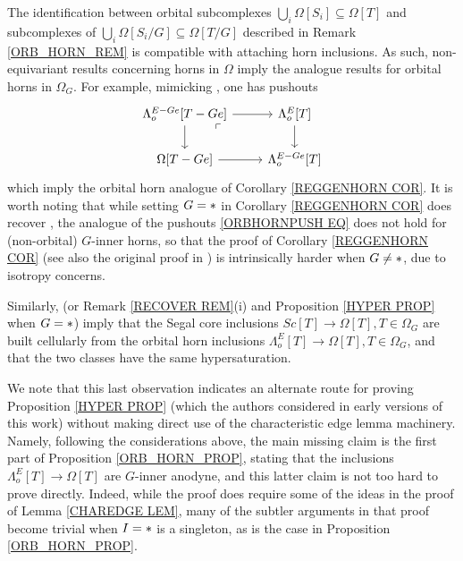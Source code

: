 \documentclass[a4paper,10pt
,draft
]{article}%
\begin{document}
\begin{remark}
	The identification between orbital subcomplexes 
	$\bigcup_i \Omega[S_i] \subseteq \Omega[T]$ and subcomplexes of 
	$\bigcup_i \Omega[S_i/G] \subseteq \Omega[T/G]$
	described in Remark \ref{ORB_HORN_REM}
	is compatible with attaching horn inclusions.
	As such, non-equivariant results concerning horns in $\Omega$
	imply the analogue results for orbital horns in $\Omega_G$. For example, mimicking \cite[Lemma 5.1]{MW09}, one has pushouts	
\begin{equation}\label{ORBHORNPUSH EQ}
\begin{tikzcd}
	\Lambda^{E - G e}_o[T - Ge] \arrow[r] \arrow[d]
	\arrow[dr, phantom, "\ulcorner", very near start] &
	\Lambda^{E}_o[T] \arrow[d]
\\
	\Omega[T - G e] \arrow[r]&
	\Lambda^{E - G e}_o[T]
\end{tikzcd}
\end{equation}	
which imply the orbital horn analogue of 
Corollary \ref{REGGENHORN COR}.
It is worth noting that while setting $G=\**$ in 
Corollary \ref{REGGENHORN COR} does recover
\cite[Lemma 5.1]{MW09}, 
the analogue of the pushouts \eqref{ORBHORNPUSH EQ}
does not hold for (non-orbital) $G$-inner horns,
so that the proof of Corollary \ref{REGGENHORN COR}
(see also the original proof in \cite[Prop. 6.17]{Per18})
is intrinsically harder when $G \neq \**$,
due to isotropy concerns.

Similarly, \cite[Props. 2.4 and 2.5]{CM13a} 
(or Remark \ref{RECOVER REM}(i) and Proposition \ref{HYPER PROP} when $G=\**$)
imply that the Segal core inclusions 
$Sc[T] \to \Omega[T], T \in \Omega_G$
are built cellularly from the orbital horn inclusions
$\Lambda^E_o[T] \to \Omega[T], T \in \Omega_G$, and that the two classes have the same hypersaturation. 

	We note that this last observation indicates an alternate route for proving Proposition \ref{HYPER PROP}
	(which the authors considered in early versions of this work)
	without making direct use of the characteristic edge lemma machinery.
	Namely, following the considerations above, the main missing claim is the first part of Proposition \ref{ORB_HORN_PROP}, stating that the inclusions
	$\Lambda^E_o[T] \to \Omega[T]$ are $G$-inner anodyne, and this latter claim is not too hard to prove directly. 
	Indeed, while the proof does require some of the ideas in the proof of Lemma \ref{CHAREDGE LEM},
	many of the subtler arguments in that proof
	become trivial when $I=\**$ is a singleton, as is the case in Proposition \ref{ORB_HORN_PROP}.
\end{remark}
\end{document}
